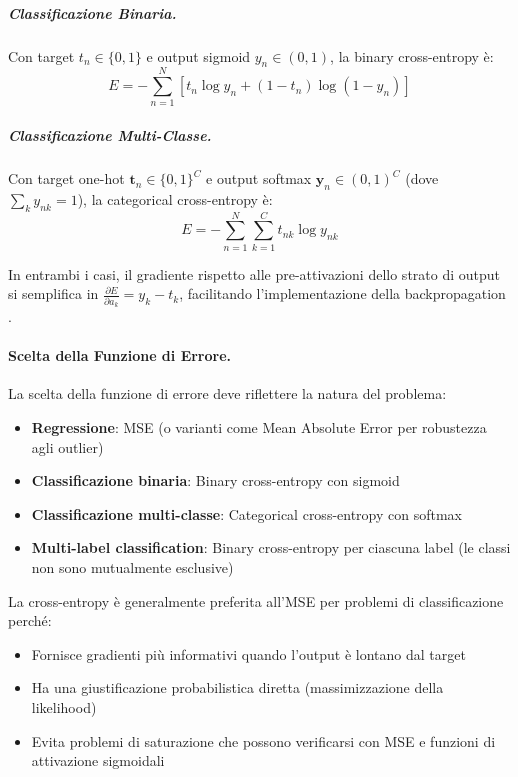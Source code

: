 \subparagraph{Classificazione Binaria.} 
Con target $t_n \in \{0,1\}$ e output sigmoid $y_n \in (0,1)$, la binary cross-entropy è:
\[
E = -\sum_{n=1}^{N} \left[ t_n \log y_n + (1-t_n) \log(1-y_n) \right]
\]

\subparagraph{Classificazione Multi-Classe.} 
Con target one-hot $\mathbf{t}_n \in \{0,1\}^C$ e output softmax $\mathbf{y}_n \in (0,1)^C$ (dove $\sum_k y_{nk}=1$), la categorical cross-entropy è:
\[
E = -\sum_{n=1}^{N} \sum_{k=1}^{C} t_{nk} \log y_{nk}
\]

In entrambi i casi, il gradiente rispetto alle pre-attivazioni dello strato di output si semplifica in $\frac{\partial E}{\partial a_k} = y_k - t_k$, facilitando l'implementazione della backpropagation \cite{goodfellow2016deep}.

\paragraph{Scelta della Funzione di Errore.} La scelta della funzione di errore deve riflettere la natura del problema:

\begin{itemize}
\item \textbf{Regressione}: MSE (o varianti come Mean Absolute Error per robustezza agli outlier)
\item \textbf{Classificazione binaria}: Binary cross-entropy con sigmoid
\item \textbf{Classificazione multi-classe}: Categorical cross-entropy con softmax
\item \textbf{Multi-label classification}: Binary cross-entropy per ciascuna label (le classi non sono mutualmente esclusive)
\end{itemize}

La cross-entropy è generalmente preferita all'MSE per problemi di classificazione perché:
\begin{itemize}
\item Fornisce gradienti più informativi quando l'output è lontano dal target
\item Ha una giustificazione probabilistica diretta (massimizzazione della likelihood)
\item Evita problemi di saturazione che possono verificarsi con MSE e funzioni di attivazione sigmoidali
\end{itemize}


